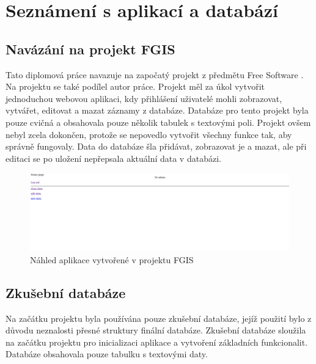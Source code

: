 \chapter{Seznámení s aplikací a databází}
\label{3-seznameni-s-aplikaci-a-databazi}

\section{Navázání na projekt FGIS}

Tato diplomová práce navazuje na započatý projekt z předmětu Free
Software . Na projektu se také podílel autor práce. 
Projekt měl za úkol vytvořit jednoduchou webovou aplikaci, kdy
přihlášení uživatelé mohli zobrazovat, vytvářet, editovat a mazat záznamy
z databáze. Databáze pro tento projekt byla pouze cvičná a obsahovala
pouze několik tabulek s textovými poli. Projekt ovšem nebyl zcela
dokončen, protože se nepovedlo vytvořit všechny funkce tak, aby
správně fungovaly. Data do databáze šla přidávat, zobrazovat je a 
mazat, ale při editaci se po uložení nepřepsala aktuální data v
databázi.

\begin{figure}[H] \centering
    \includegraphics[width=400pt]{./pictures/4-nahled-menu-fgis.PNG}
    \caption[Náhled aplikace vytvořené v projektu FGIS]{Náhled aplikace vytvořené v projektu FGIS}
	\label{fig:Náhled aplikace}              
\end{figure}
 
 \section{Zkušební databáze}
 
Na začátku projektu byla používána pouze zkušební databáze, jejíž použití 
bylo z důvodu neznalosti přesné struktury finální databáze. Zkušební databáze 
sloužila na začátku projektu pro inicializaci aplikace a vytvoření základních 
funkcionalit. Databáze obsahovala pouze tabulku s textovými daty.

 \newpage

